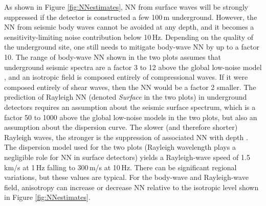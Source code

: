 As shown in Figure \ref{fig:NNestimates}, NN from surface waves will be strongly suppressed if the detector is constructed a few 100\,m underground. However, the NN from seismic body waves cannot be avoided at any depth, and it becomes a sensitivity-limiting noise contribution below 10\,Hz. Depending on the quality of the underground site, one still needs to mitigate body-wave NN by up to a factor 10. The range of body-wave NN shown in the two plots assumes that underground seismic spectra are a factor 3 to 12 above the global low-noise model \cite{Pet1993}, and an isotropic field is composed entirely of compressional waves. If it were composed entirely of shear waves, then the NN would be a factor 2 smaller. The prediction of Rayleigh NN (denoted {\it Surface} in the two plots) in underground detectors requires an assumption about the seismic surface spectrum, which is a factor 50 to 1000 above the global low-noise models in the two plots, but also an assumption about the dispersion curve. The slower (and therefore shorter) Rayleigh waves, the stronger is the suppression of associated NN with depth \cite{Har2015}. The dispersion model used for the two plots (Rayleigh wavelength plays a negligible role for NN in surface detectors) yields a Rayleigh-wave speed of 1.5\,km/s at 1\,Hz falling to 300\,m/s at 10\,Hz. There can be significant regional variations, but these values are typical. For the body-wave and Rayleigh-wave field, anisotropy can increase or decrease NN relative to the isotropic level shown in Figure \ref{fig:NNestimates}.

